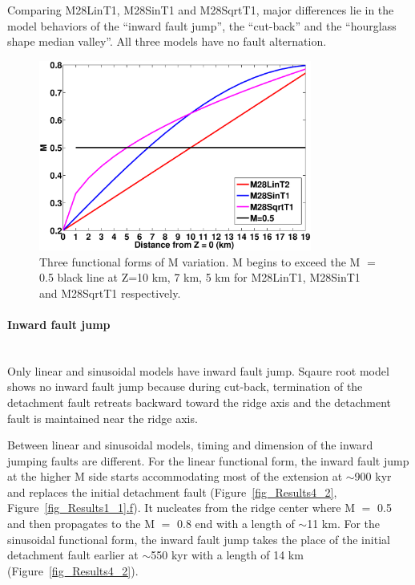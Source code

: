 Comparing M28LinT1, M28SinT1 and M28SqrtT1, major differences lie in the model behaviors of the ``inward fault jump'', the ``cut-back'' and the ``hourglass shape median valley''. All three models have no fault alternation.    

\begin{figure}[h]
  \centering
    \includegraphics[width=0.8\textwidth]{./Figures/fig_Results_3_3_M_variation.eps}
  \caption{Three functional forms of M variation. M begins to exceed the M $=$ 0.5 black line at Z=10 km, 7 km, 5 km for M28LinT1, M28SinT1 and M28SqrtT1 respectively.}
 \label{fig_Results3_1}
\end{figure}   

\paragraph{Inward fault jump}\label{para_InwardFaultJump}
~\\
Only linear and sinusoidal models have inward fault jump. Sqaure root model shows no inward fault jump because during cut-back, termination of the detachment fault retreats backward toward the ridge axis and the detachment fault is maintained near the ridge axis.

Between linear and sinusoidal models, timing and dimension of the inward jumping faults are different. For the linear functional form, the inward fault jump at the higher M side starts accommodating most of the extension at $\sim$900 kyr and replaces the initial detachment fault (Figure~\hyperref[fig_Results4_2]{\ref{fig_Results4_2}}, Figure~\hyperref[fig_Results1_1]{\ref{fig_Results1_1}.f}). It nucleates from the ridge center where M $=$ 0.5 and then propagates to the M $=$ 0.8 end with a length of $\sim$11 km. 
For the sinusoidal functional form, the inward fault jump takes the place of the initial detachment fault earlier at $\sim$550 kyr with a length of 14 km (Figure~\hyperref[fig_Results4_2]{\ref{fig_Results4_2}}).

